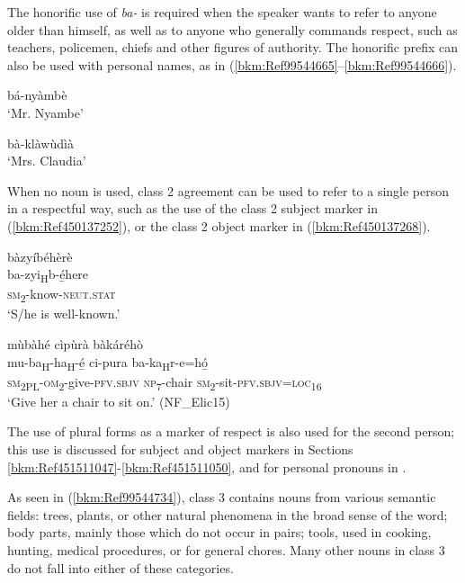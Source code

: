 The honorific use of \textit{ba-} is required when the speaker wants to refer to anyone older than himself, as well as to anyone who generally commands respect, such as teachers, policemen, chiefs and other figures of authority. The honorific prefix can also be used with personal names, as in (\ref{bkm:Ref99544665}--\ref{bkm:Ref99544666}).

\ea
\label{bkm:Ref99544665}
  bá-nyàmbè\\
\glt ‘Mr. Nyambe’
\z

\ea
\label{bkm:Ref99544666}
  bà-klàwùdìà\\
\glt ‘Mrs. Claudia’
\z

When no noun is used, class 2 agreement can be used to refer to a single person in a respectful way, such as the use of the class 2 subject marker in (\ref{bkm:Ref450137252}), or the class 2 object marker in (\ref{bkm:Ref450137268}).

\ea
\label{bkm:Ref450137252}
\glll bàzyíbéhèrè\\
ba-zyi\textsubscript{H}b-é̲here\\
\textsc{sm}\textsubscript{2}-know-\textsc{neut}.\textsc{stat}\\
\glt ‘S/he is well-known.’
\z

\ea
\label{bkm:Ref450137268}
mùbàhé cìpùrà bàkáréhò\\
\gll mu-ba\textsubscript{H}-ha\textsubscript{H}-é̲    ci-pura  ba-ka\textsubscript{H}r-e=hó̲\\
\textsc{sm}\textsubscript{2PL}-\textsc{om}\textsubscript{2}-give-\textsc{pfv}.\textsc{sbjv}  \textsc{np}\textsubscript{7}-chair  \textsc{sm}\textsubscript{2}-sit-\textsc{pfv}.\textsc{sbjv}=\textsc{loc}\textsubscript{16}\\
\glt ‘Give her a chair to sit on.’ (NF\_Elic15)
\z

The use of plural forms as a marker of respect is also used for the second person; this use is discussed for subject and object markers in Sections \ref{bkm:Ref451511047}-\ref{bkm:Ref451511050}, and for personal pronouns in .

As seen in (\ref{bkm:Ref99544734}), class 3 contains nouns from various semantic fields: trees, plants, or other natural phenomena in the broad sense of the word; body parts, mainly those which do not occur in pairs; tools, used in cooking, hunting, medical procedures, or for general chores. Many other nouns in class 3 do not fall into either of these categories.

\ea
\label{bkm:Ref99544734}

